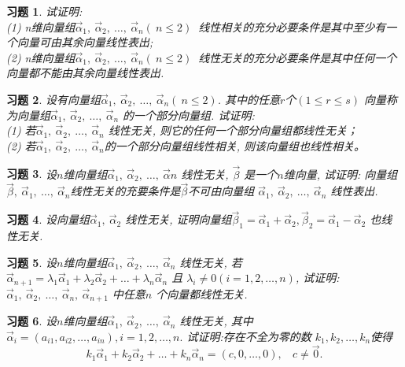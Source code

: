 \documentclass[a4paper]{book}
\newtheorem{ex}{习题}[chapter]
\begin{document}
\begin{ex}\label{4.10}
试证明:\\
(1) n维向量组$\vec{\alpha}_1, \ \vec{\alpha}_2, \ \dots,\ \vec{\alpha}_n(\ n\leq 2)\ $ 线性相关的充分必要条件是其中至少有一个向量可由其余向量线性表出;\\
(2) n维向量组$\vec{\alpha}_1, \ \vec{\alpha}_2, \ \dots,\ \vec{\alpha}_n(\ n\leq 2)\ $ 线性无关的充分必要条件是其中任何一个向量都不能由其余向量线性表出.
\end{ex}

\begin{ex}\label{4.11}
设有向量组$\vec{\alpha}_1, \ \vec{\alpha}_2, \ \dots,\ \vec{\alpha}_n(\ n\leq 2)$. 其中的任意$r$个$(1\leq r\leq s)$ 向量称为向量组$\vec{\alpha}_1, \ \vec{\alpha}_2, \ \dots,\ \vec{\alpha}_n$
的一个部分向量组. 试证明:\\
(1) 若$\vec{\alpha}_1, \ \vec{\alpha}_2, \ \dots,\ \vec{\alpha}_n$ 线性无关, 则它的任何一个部分向量组都线性无关；\\
(2) 若$\vec{\alpha}_1, \ \vec{\alpha}_2, \ \dots,\ \vec{\alpha}_n$的一个部分向量组线性相关, 则该向量组也线性相关。
\end{ex}

\begin{ex}\label{4.12}
设$n$维向量组$\vec{\alpha}_1, \ \vec{\alpha}_2, \ \dots,\ \vec{\alpha}n$ 线性无关, $\vec{\beta}$ 是一个$n$维向量,
试证明: 向量组$\vec{\beta},\ \vec{\alpha}_1, \ \dots,\ \vec{\alpha}_n$线性无关的充要条件是$\vec{\beta}$不可由向量组
$\vec{\alpha}_1, \ \vec{\alpha}_2, \ \dots,\ \vec{\alpha}_n$ 线性表出.
\end{ex}

\begin{ex}\label{4.13}
设向量组$\vec{\alpha}_1,\ \vec{\alpha}_2$ 线性无关,
证明向量组$\vec{\beta}_1=\vec{\alpha}_1+\vec{\alpha}_2, \vec{\beta}_2=\vec{\alpha}_1-\vec{\alpha}_2$ 也线性无关.
\end{ex}

\begin{ex}\label{4.14}
设$n$维向量组$\vec{\alpha}_1, \ \vec{\alpha}_2, \ \dots,\ \vec{\alpha}_n$ 线性无关, 若$\vec{\alpha}_{n+1}=\lambda_1\vec{\alpha}_1+\lambda_2\vec{\alpha}_2+\dots+\lambda_n\vec{\alpha}_n$ 且
$\lambda_i\not=0(i=1,2,\dots, n)$, 试证明: $\vec{\alpha}_1, \ \vec{\alpha}_2, \ \dots,\ \vec{\alpha}_n,\ \vec{\alpha}_{n+1}$ 中任意$n$ 个向量都线性无关.
\end{ex}

\begin{ex}\label{4.15}
设$n$维向量组$\vec{\alpha}_1, \ \vec{\alpha}_2, \ \dots,\ \vec{\alpha}_n$ 线性无关, 其中$\vec{\alpha}_i=(a_{i1},a_{i2},\dots,a_{in}),i=1,2,\dots,n.$ 试证明:存在不全为零的数
$k_1,k_2,\dots,k_n$使得$$k_1\vec{\alpha}_1+k_2\vec{\alpha}_2+\dots+k_n\vec{\alpha}_n=(c,0,\dots,0),\ \ \ \ c\not=\vec{0}.$$
\end{ex}
\end{document}
